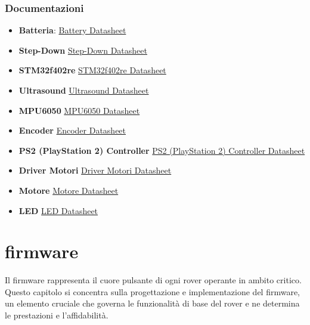 \documentclass{article}
\begin{document}
\section{Documentazioni}
\begin{itemize}
    \item \textbf{Batteria}: \href{https://asset.conrad.com/media10/add/160267/c1/-/en/002145181TS00/rapporto-di-prova-2145181-gens-ace-batteria-ricaricabile-lipo-111-v-2200-mah-numero-di-celle-3-45-c-softcase-xt60.pdf}{Battery Datasheet}
    
    \item \textbf{Step-Down}
    \href{https://store.mectronica.it/it/alimentatori/2096-modulo-di-alimentazione-step-down-conversione-di-tensione-da-1224v-a-5-v-5-a.html}{Step-Down Datasheet}
    \item \textbf{STM32f402re}
    \href{https://www.st.com/en/evaluation-tools/nucleo-f401re.html}{STM32f402re Datasheet}
    
    \item \textbf{Ultrasound}
    \href{https://cdn.sparkfun.com/datasheets/Sensors/Proximity/HCSR04.pdf}{Ultrasound Datasheet}
    
    \item \textbf{MPU6050}
    \href{https://invensense.tdk.com/wp-content/uploads/2015/02/MPU-6000-Datasheet1.pdf}{MPU6050 Datasheet}
\item \textbf{Encoder}
    \href{https://cdn.robotshop.com/media/2/2dm/rb-2dm-02/pdf/36gp540-51-en.pdf}{Encoder Datasheet}
    \item \textbf{PS2 (PlayStation 2) Controller}
    \href{https://store.curiousinventor.com/guides/PS2/}{PS2 (PlayStation 2) Controller
 Datasheet}
 \item \textbf{Driver Motori}
\href{https://www.dimensionengineering.com/datasheets/Sabertooth2x12.pdf}{Driver Motori Datasheet}
    \item \textbf{Motore}
    \href{https://cdn.robotshop.com/media/2/2dm/rb-2dm-02/pdf/36gp540-51-en.pdf}{Motore Datasheet}
    \item \textbf{LED}
    \href{https://wiki.lynxmotion.com/info/wiki/lynxmotion/view/servo-erector-set-system/ses-electronics/ses-modules/a4wd3-led-board/#HSpecifications}{LED Datasheet}

\end{itemize}
\part{firmware}
  Il firmware rappresenta il cuore pulsante di ogni rover operante in ambito critico. Questo capitolo si concentra sulla progettazione e implementazione del firmware, un elemento cruciale che governa le funzionalità di base del rover e ne determina le prestazioni e l’affidabilità.
\end{document}
